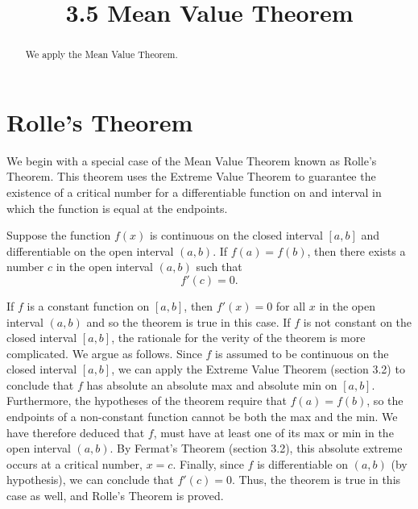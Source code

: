 \documentclass[handout]{ximera}
\title{3.5 Mean Value Theorem}
\begin{document}
\begin{abstract}
We apply the Mean Value Theorem.
\end{abstract}

\maketitle


\section{Rolle's Theorem}

We begin with a special case of the Mean Value Theorem known as Rolle's Theorem.
This theorem uses the Extreme Value Theorem to guarantee the existence of a critical number for a differentiable 
function on and interval in which the function is equal at the endpoints.

\begin{theorem}
Suppose the function $f(x)$ is continuous on the closed interval $[a,b]$ and differentiable on the open interval $(a,b)$.
If $f(a) = f(b)$, then there exists a number $c$ in the open interval $(a,b)$ such that 
\[
f'(c) = 0.
\]
\end{theorem}

\begin{image}
\end{image}
If $f$ is a constant function on $[a,b]$, then $f'(x)= 0$ for all $x$ in the open interval $(a,b)$ and so the theorem is true in this case.
If $f$ is not constant on the closed interval $[a,b]$, the rationale for the verity of the theorem is more complicated.
We argue as follows.
Since $f$ is assumed to be continuous on the closed interval $[a,b]$, we can apply the Extreme Value Theorem (section 3.2) to conclude
that $f$ has absolute an absolute max and absolute min on $[a,b]$.
Furthermore, the hypotheses of the theorem require that $f(a) = f(b)$, so the endpoints of a non-constant function cannot be both the max and the min.
We have therefore deduced that 
$f$, must have at least one of its max or min in the open interval $(a,b)$.
By Fermat's Theorem (section 3.2), this absolute extreme occurs at a critical number, $x= c$. 
Finally, since $f$ is differentiable on $(a,b)$ (by hypothesis), we can conclude 
that $f'(c) = 0$. 
Thus, the theorem is true in this case as well, and Rolle's Theorem is proved.
\end{document}
